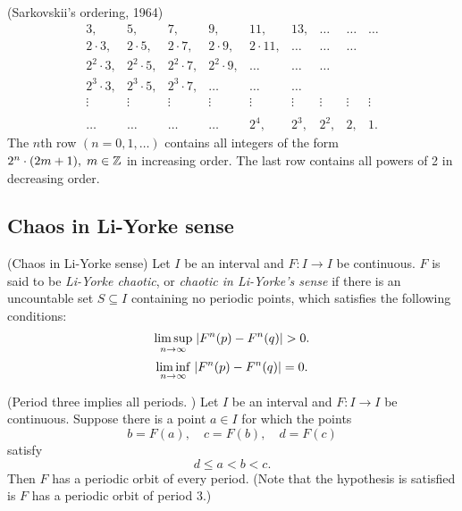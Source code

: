 \documentclass[11pt]{article}
\begin{document}
\begin{definition}
  (Sarkovskii's ordering, 1964)
  \[
    \begin{array}{ccccccccc}
    3, & 5, & 7, & 9, & 11, & 13, & \ldots & \ldots & \ldots\\
    2\cdot 3, & 2\cdot 5, & 2\cdot 7, & 2\cdot 9, & 2\cdot 11, & \ldots & \ldots & \ldots\\
    2^2\cdot 3, & 2^2\cdot 5, & 2^2\cdot 7, & 2^2\cdot 9, & \ldots & \ldots & \ldots\\
    2^3\cdot 3, & 2^3\cdot 5, & 2^3\cdot 7, & \ldots & \ldots & \ldots\\
    \vdots & \vdots & \vdots & \vdots & \vdots & \vdots & \vdots & \vdots  & \vdots \\
    \\
    \ldots & \ldots & \ldots & \ldots & 2^4, & 2^3, & 2^2, & 2, & 1.
  \end{array}
  \]
  The $n$th row $(n = 0, 1, \ldots)$ contains all integers of the form $2^n\cdot (2m + 1),\; m \in \mathbb{Z}$ in increasing order.
  The last row contains all powers of 2 in decreasing order.
  \label{defn:sarkovskiiordering}
\end{definition}

\subsection{Chaos in Li-Yorke sense}
\begin{definition}
  (Chaos in Li-Yorke sense)
  Let $I$ be an interval and $F: I\to I$ be continuous. $F$ is said to be \textit{Li-Yorke chaotic}, or 
  \textit{chaotic in Li-Yorke's sense} if there is an uncountable set $S \subseteq I$ containing no
  periodic points, which satisfies the following conditions:
  \begin{equation*}
    \limsup\limits_{n \to \infty}\; \lvert F^n(p) - F^n(q)\rvert > 0.
  \end{equation*}
  \begin{equation*}
    \liminf\limits_{n \to \infty}\; \lvert F^n(p) - F^n(q)\rvert = 0.
  \end{equation*}

\end{definition}

\begin{proposition}
  (Period three implies all periods. \cite{li-yorke})
  Let $I$ be an interval and $F: I\to I$ be continuous. Suppose there is a point $a \in I$ for which
  the points
  \begin{equation*}
  b = F(a), \quad c = F(b), \quad d = F(c)
  \end{equation*}
  satisfy
  \begin{equation*}
    d \leq a < b < c.
  \end{equation*}
  Then $F$ has a periodic orbit of every period.
  (Note that the hypothesis is satisfied is $F$ has a periodic orbit of period 3.)
  \label{thm:liyorke1}
\end{proposition}
\end{document}
